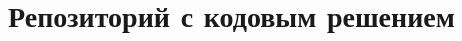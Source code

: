 \documentclass[times,specification,annotation]{itmo-student-thesis}
\begin{document}
\chapter{Репозиторий с кодовым решением}\label{sec:app:2}




\end{document}
